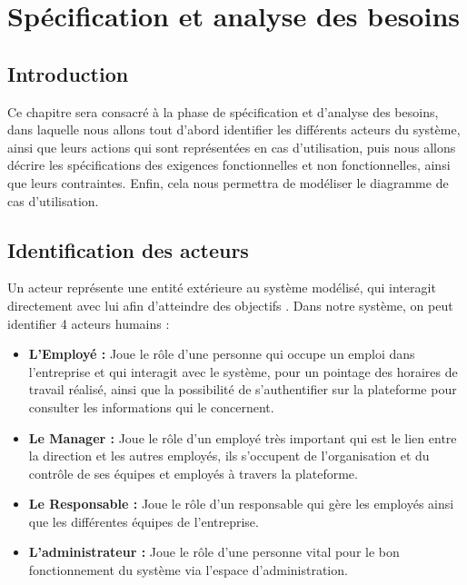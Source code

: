 \chapter{Spécification et analyse des besoins
}
\renewcommand{\headrulewidth}{1pt}


\section{Introduction}
    Ce chapitre sera consacré à la phase de spécification et d’analyse des besoins, dans laquelle nous allons tout d’abord identifier les différents acteurs du système, ainsi que leurs actions qui sont représentées en cas d’utilisation, puis nous allons décrire les spécifications des exigences fonctionnelles et non fonctionnelles, ainsi que leurs contraintes. Enfin, cela nous permettra de modéliser le diagramme de cas d’utilisation. 

\section{Identification des acteurs}
    Un acteur représente une entité extérieure au système modélisé, qui interagit directement avec lui afin d’atteindre des objectifs \cite{4}. Dans notre système, on peut identifier 4 acteurs humains :
    
    
    \begin{itemize}
 
        \item[\textbullet] \textbf{L’Employé :} Joue le rôle d’une personne qui occupe un emploi dans l’entreprise et qui interagit avec le système, pour un pointage des horaires de travail réalisé, ainsi que la possibilité de s’authentifier sur la plateforme pour consulter les informations qui le concernent.
        
        \item[\textbullet] \textbf{Le Manager :} Joue le rôle d’un employé très important qui est le lien entre la direction et les autres employés, ils s’occupent de l’organisation et du contrôle de ses équipes et employés à travers la plateforme.
        
        
        \item[\textbullet] \textbf{Le Responsable :} Joue le rôle d’un responsable qui gère les employés ainsi que les différentes équipes de l’entreprise.
        
        \item[\textbullet] \textbf{L’administrateur :} Joue le rôle d’une personne vital pour le bon fonctionnement du système via l’espace d’administration.
    
    \end{itemize}
    
